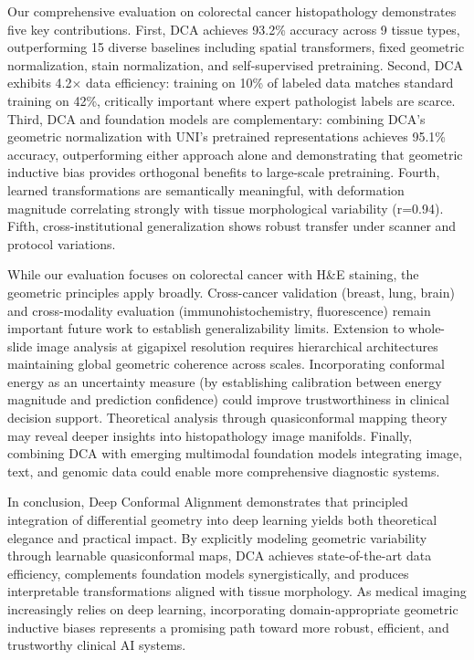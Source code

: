 \documentclass[10pt,journal,compsoc]{IEEEtran}
\begin{document}
Our comprehensive evaluation on colorectal cancer histopathology demonstrates five key contributions. First, DCA achieves 93.2\% accuracy across 9 tissue types, outperforming 15 diverse baselines including spatial transformers, fixed geometric normalization, stain normalization, and self-supervised pretraining. Second, DCA exhibits 4.2$\times$ data efficiency: training on 10\% of labeled data matches standard training on 42\%, critically important where expert pathologist labels are scarce. Third, DCA and foundation models are complementary: combining DCA's geometric normalization with UNI's pretrained representations achieves 95.1\% accuracy, outperforming either approach alone and demonstrating that geometric inductive bias provides orthogonal benefits to large-scale pretraining. Fourth, learned transformations are semantically meaningful, with deformation magnitude correlating strongly with tissue morphological variability (r=0.94). Fifth, cross-institutional generalization shows robust transfer under scanner and protocol variations.

While our evaluation focuses on colorectal cancer with H\&E staining, the geometric principles apply broadly. Cross-cancer validation (breast, lung, brain) and cross-modality evaluation (immunohistochemistry, fluorescence) remain important future work to establish generalizability limits. Extension to whole-slide image analysis at gigapixel resolution requires hierarchical architectures maintaining global geometric coherence across scales. Incorporating conformal energy as an uncertainty measure (by establishing calibration between energy magnitude and prediction confidence) could improve trustworthiness in clinical decision support. Theoretical analysis through quasiconformal mapping theory may reveal deeper insights into histopathology image manifolds. Finally, combining DCA with emerging multimodal foundation models integrating image, text, and genomic data could enable more comprehensive diagnostic systems.

In conclusion, Deep Conformal Alignment demonstrates that principled integration of differential geometry into deep learning yields both theoretical elegance and practical impact. By explicitly modeling geometric variability through learnable quasiconformal maps, DCA achieves state-of-the-art data efficiency, complements foundation models synergistically, and produces interpretable transformations aligned with tissue morphology. As medical imaging increasingly relies on deep learning, incorporating domain-appropriate geometric inductive biases represents a promising path toward more robust, efficient, and trustworthy clinical AI systems.



\end{document}
